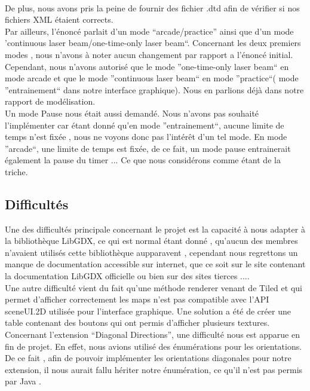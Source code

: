 \documentclass[a4paper,10pt]{article}
\begin{document}
\\
De plus, nous avons pris la peine de fournir des fichier .dtd afin de vérifier si nos fichiers XML étaient corrects.
\\
Par ailleurs, l'énoncé parlait d'un mode ``arcade/practice'' ainsi que d'un mode 'continuous laser beam/one-time-only laser beam``. Concernant les
deux premiers modes , nous n'avons à noter aucun changement par rapport a l'énoncé initial. Cependant, nous n'avons autorisé que le mode ''one-time-only laser beam``
en mode arcade et que le mode ''continuous laser beam`` en mode ''practice``( mode ''entrainement`` dans notre interface graphique).
Nous en parlions déjà dans notre rapport de modélisation.
\\
Un mode Pause nous était aussi demandé. Nous n'avons pas souhaité l'implémenter car étant donné qu'en mode ''entrainement``, aucune limite de
temps n'est fixée , nous ne voyons donc pas l'intérêt d'un tel mode. En mode ''arcade``, une limite de temps est fixée, de ce fait, un mode pause entrainerait
également la pause du timer ... Ce que nous considérons comme étant de la triche.

\subsection{Difficultés}
Une des difficultés principale concernant le projet est la capacité à nous adapter à la bibliothèque LibGDX, ce qui est normal étant donné , qu'aucun des membres
n'avaient utilisés cette bibliothèque aupparavent , cependant nous regrettons un manque de documentation accessible sur internet, que ce soit sur 
le site contenant la documentation LibGDX officielle ou bien sur des sites tierces ....
\\
Une autre difficulté vient du fait qu'une méthode renderer venant de Tiled et qui permet d'afficher correctement les maps n'est pas compatible avec
l'API sceneUI.2D utilisée pour l'interface graphique. Une solution a été de créer une table contenant des boutons qui ont permis d'afficher plusieurs
textures.
\\
Concernant l'extension ``Diagonal Directions'', une difficulté nous est apparue en fin de projet. En effet, nous avions utilisé des énumérations pour
les orientations. De ce fait , afin de pouvoir implémenter les orientations diagonales pour notre extension, il nous aurait fallu hériter notre énumération,
 ce qu'il n'est pas permis par Java .
\end{document}
